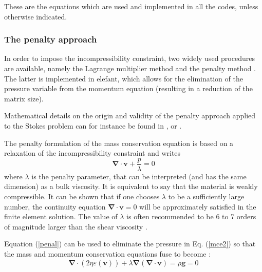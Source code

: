 \documentclass[a4paper]{article}
\begin{document}
These are the equations which are used and implemented in all the codes, unless otherwise
indicated.

\subsubsection{The penalty approach}


In order to impose the incompressibility constraint, two widely used procedures are available, namely the 
Lagrange multiplier method and the penalty method \cite{bathe82,hugh}. The latter is implemented in {\sc elefant}, which allows for the elimination of the pressure variable from the momentum equation (resulting in a reduction of the matrix size).%

Mathematical details on the origin and validity of the penalty approach applied to the Stokes problem can for instance be found in  \cite{cuss86}, \cite{redd82} or \cite{gunz89}.

The penalty formulation of the mass conservation equation is based on a relaxation of the incompressibility constraint and writes 
\begin{equation}
{\bm \nabla}\cdot {\bm v} + \frac{p}{\lambda} = 0 \label{penal}
\end{equation}
where $\lambda$ is the penalty parameter, that can be interpreted (and has the same dimension) as a bulk viscosity. It is 
equivalent to say that the material is weakly compressible. It can be shown that if one chooses $\lambda$ to be a 
sufficiently large number, the continuity equation $ {\bm \nabla}\cdot {\bm v} = 0$ will be approximately satisfied in the finite element solution. The value of $\lambda$ is often recommended to be 6 to 7 orders of magnitude larger than the shear viscosity \cite{dohu03,hulb79}.


Equation (\ref{penal}) can be used to eliminate the pressure in Eq. (\ref{mce2}) so that the mass and momentum conservation equations fuse to become :
\begin{equation}
{\bm \nabla}\cdot ( 2 \eta \dot\varepsilon({\bm v})) + \lambda {\bm \nabla} ({\bm \nabla }\cdot {\bm v}) = \rho {\bm g} = 0 \label{peneq}
\end{equation}
\end{document}
